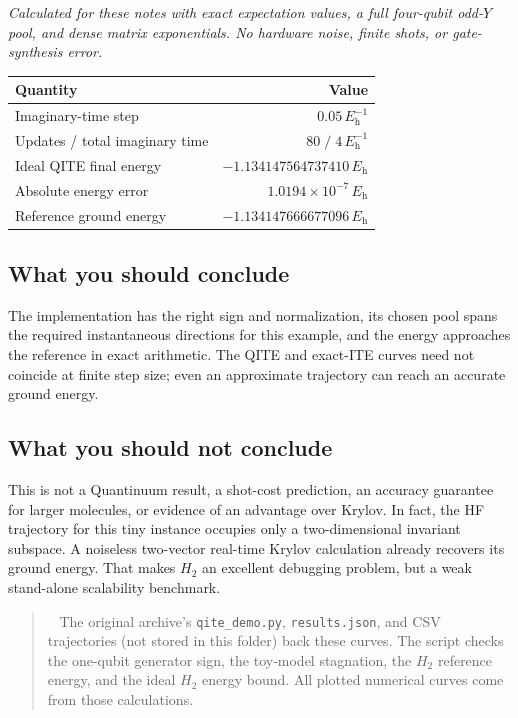 \documentclass[11pt,a4paper]{article}
\newcommand{\Eh}{E_{\mathrm h}}
\newenvironment{idea}[1][Main idea]{\par\smallskip\begin{quotation}\noindent{\bfseries\textcolor{keyblue}{#1.}}\ }{\end{quotation}\smallskip}
\begin{document}
\small\textit{Calculated for these notes with exact expectation values, a full four-qubit odd-$Y$ pool, and dense matrix exponentials. No hardware noise, finite shots, or gate-synthesis error.}\normalsize

\begin{tabularx}{\linewidth}{@{}X r@{}}
\toprule
Quantity & Value\\\midrule
Imaginary-time step & $0.05\,\Eh^{-1}$\\
Updates / total imaginary time & $80\;/\;4\,\Eh^{-1}$\\
Ideal QITE final energy & $-1.134147564737410\,\Eh$\\
Absolute energy error & $1.0194\times10^{-7}\,\Eh$\\
Reference ground energy & $-1.134147666677096\,\Eh$\\\bottomrule
\end{tabularx}

\subsection*{What you should conclude}
The implementation has the right sign and normalization, its chosen pool spans the required instantaneous directions for this example, and the energy approaches the reference in exact arithmetic. The QITE and exact-ITE curves need not coincide at finite step size; even an approximate trajectory can reach an accurate ground energy.

\subsection*{What you should not conclude}
This is not a Quantinuum result, a shot-cost prediction, an accuracy guarantee for larger molecules, or evidence of an advantage over Krylov. In fact, the HF trajectory for this tiny instance occupies only a two-dimensional invariant subspace. A noiseless two-vector real-time Krylov calculation already recovers its ground energy. That makes $H_2$ an excellent debugging problem, but a weak stand-alone scalability benchmark.

\begin{idea}[Provenance and reproducibility]
The original archive's \texttt{qite\_demo.py}, \texttt{results.json}, and CSV trajectories (not stored in this folder) back these curves. The script checks the one-qubit generator sign, the toy-model stagnation, the $H_2$ reference energy, and the ideal $H_2$ energy bound. All plotted numerical curves come from those calculations.
\end{idea}
\end{document}
